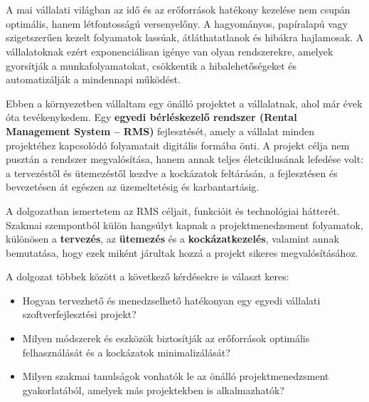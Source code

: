 \chapter{\bevezetes}

A mai vállalati világban az idő és az erőforrások hatékony kezelése nem csupán optimális, hanem létfontosságú versenyelőny. 
A hagyományos, papíralapú vagy szigetszerűen kezelt folyamatok lassúak, átláthatatlanok és hibákra hajlamosak. 
A vállalatoknak ezért exponenciálisan igénye van olyan rendszerekre, amelyek gyorsítják a munkafolyamatokat, csökkentik 
a hibalehetőségeket és automatizálják a mindennapi működést.

Ebben a környezetben vállaltam egy önálló projektet a vállalatnak, ahol már évek óta tevékenykedem.
Egy \textbf{egyedi bérléskezelő rendszer (Rental Management System – RMS)} fejlesztését, 
amely a vállalat minden projektéhez kapcsolódó folyamatait digitális formába önti. 
A projekt célja nem pusztán a rendszer megvalósítása, hanem annak teljes életciklusának lefedése volt: a tervezéstől és ütemezéstől kezdve a kockázatok feltárásán, 
a fejlesztésen és bevezetésen át egészen az üzemeltetésig és karbantartásig.

A dolgozatban ismertetem az RMS céljait, funkcióit és technológiai hátterét. 
Szakmai szempontból külön hangsúlyt kapnak a projektmenedzsment folyamatok, 
különösen a \textbf{tervezés}, az \textbf{ütemezés} és a \textbf{kockázatkezelés}, valamint annak bemutatása, 
hogy ezek miként járultak hozzá a projekt sikeres megvalósításához.

\vspace{1em}
\noindent A dolgozat többek között a következő kérdésekre is választ keres:
\begin{itemize}
    \item Hogyan tervezhető és menedzselhető hatékonyan egy egyedi vállalati szoftverfejlesztési projekt?
    \item Milyen módszerek és eszközök biztosítják az erőforrások optimális felhasználását és a kockázatok minimalizálását?
    \item Milyen szakmai tanulságok vonhatók le az önálló projektmenedzsment gyakorlatából, amelyek más projektekben is alkalmazhatók?
\end{itemize}

